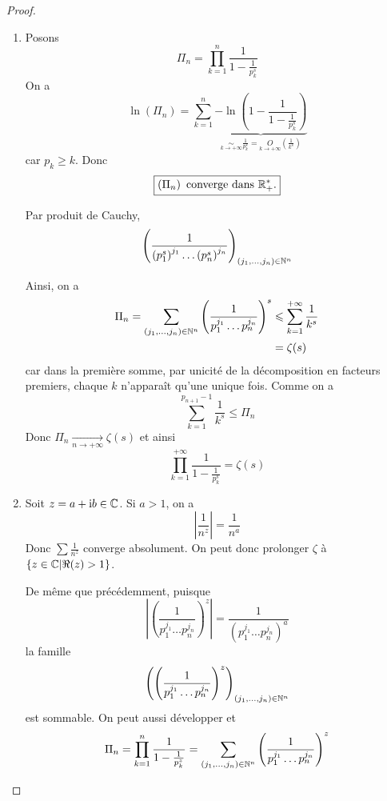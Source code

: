 \begin{proof}
\begin{enumerate}
		\item Posons 
		\begin{equation}\Pi_{n}=\prod_{k=1}^{n}\frac{1}{1-\frac{1}{p_{k}^{s}}}\end{equation}
		On a 
		\begin{equation}\ln\left(\Pi_{n}\right)=\sum_{k=1}^{n}\underbrace{-\ln\left(1-\frac{1}{1-\frac{1}{p_{k}^{s}}}\right)}_{\underset{k\to+\infty}{\sim}\frac{1}{p_{k}^{s}}=\underset{k\to+\infty}{O}\left(\frac{1}{k^{s}}\right)}\end{equation}
		car $p_{k}\geqslant k$. 
		Donc 
		\begin{equation}\boxed{\left(\Pi_{n}\right)\text{ converge dans }\mathbb{R}_{+}^{*}\text{.}}\end{equation}
		
		Par produit de Cauchy,
		\begin{equation}\left(\frac{1}{\left(p_{1}^{s}\right)^{j_{1}}\dots\left(p_{n}^{s}\right)^{j_{n}}}\right)_{(j_{1},\dots,j_{n})\in\mathbb{N}^{n}}\end{equation}
		
		Ainsi, on a 
		\begin{align}
			\Pi_{n}=\sum_{(j_{1},\dots,j_{n})\in\mathbb{N}^{n}}\left(\frac{1}{p_{1}^{j_{1}}\dots p_{n}^{j_{n}}}\right)^{s}
			&\leqslant\sum_{k=1}^{+\infty}\frac{1}{k^{s}}\\
			&=\zeta(s)
		\end{align}
		car dans la première somme, par unicité de la décomposition en facteurs premiers, chaque $k$ n'apparaît qu'une unique fois.
		Comme on a 
		\begin{equation}\sum_{k=1}^{p_{n+1}-1}\frac{1}{k^{s}}\leqslant \Pi_{n}\end{equation}
		Donc $\Pi_{n}\xrightarrow[n\to+\infty]{}\zeta(s)$ et ainsi 
		\begin{equation}\boxed{\prod_{k=1}^{+\infty}\frac{1}{1-\frac{1}{p_{k}^{s}}}=\zeta(s)}\end{equation}

		\item Soit $z=a+\mathrm{i} b\in\mathbb{C}$. Si $a>1$, on a 
		\begin{equation}\left\vert\frac{1}{n^{z}}\right\vert=\frac{1}{n^{a}}\end{equation}
		Donc $\sum \frac{1}{n^{z}}$ converge absolument. On peut donc prolonger $\zeta$ à $\left\{z\in\mathbb{C}\middle|\Re(z)>1\right\}$.

		De même que précédemment, puisque 
		\begin{equation}\left\vert\left(\frac{1}{p_{1}^{j_{1}}\dots p_{n}^{j_{n}}}\right)^{z}\right\vert=\frac{1}{\left(p_{1}^{j_{1}}\dots p_{n}^{j_{n}}\right)^{a}}\end{equation}
		la famille 
		\begin{equation}\left(\left(\frac{1}{p_{1}^{j_{1}}\dots p_{n}^{j_{n}}}\right)^{z}\right)_{(j_{1},\dots,j_{n})\in\mathbb{N}^{n}}\end{equation}
		est sommable. On peut aussi développer et 
		\begin{equation}\Pi_{n}=\prod_{k=1}^{n}\frac{1}{1-\frac{1}{p_{k}^{z}}}=\sum_{(j_{1},\dots,j_{n})\in\mathbb{N}^{n}}\left(\frac{1}{p_{1}^{j_{1}}\dots p_{n}^{j_{n}}}\right)^{z}\end{equation}
		

\end{enumerate}
\end{proof}
